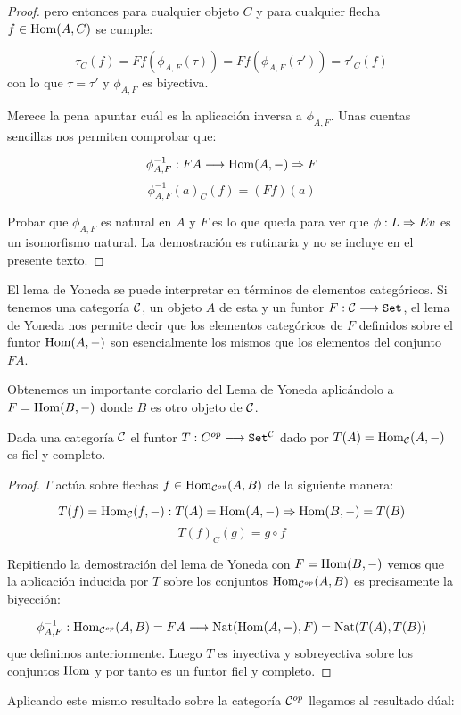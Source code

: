 \begin{proof}
  pero entonces para cualquier objeto $C$ y para cualquier flecha $f \in \operatorname{Hom}(A, C)$
  se cumple:

  $$\tau_C(f) = Ff (\phi_{A,F}(\tau)) = Ff(\phi_{A, F}(\tau')) = \tau'_C(f)$$
  con lo que $\tau = \tau'$ y $\phi_{A, F}$ es biyectiva.

  Merece la pena apuntar cuál es la aplicación inversa a $\phi_{A, F}$.
  Unas cuentas sencillas nos permiten comprobar que:

  $$\phi_{A,F}^{-1} : FA\longrightarrow \operatorname{Hom}(A, -)\Rightarrow F$$
  $$\phi_{A,F}^{-1}(a)_C(f) = (Ff)(a)$$


  Probar que $\phi_{A, F}$ es natural en $A$ y $F$ es lo que queda para ver
  que $\phi : L\Rightarrow Ev$ es un isomorfismo natural. La demostración es
  rutinaria y no se incluye en el presente texto.
\end{proof}

El lema de Yoneda se puede interpretar en términos de elementos
categóricos. Si tenemos una categoría $\mathcal{C}$, un objeto $A$ de esta
y un funtor $F : \mathcal{C}\longrightarrow \texttt{Set}$, el lema de Yoneda nos permite
decir que los elementos categóricos de $F$ definidos sobre
el funtor $\operatorname{Hom}(A, -)$ son esencialmente los mismos que los
elementos del conjunto $F A$.

Obtenemos un importante corolario del Lema de Yoneda aplicándolo a
$F = \operatorname{Hom}(B, -)$ donde $B$ es otro objeto de $\mathcal{C}$.

\begin{theorem}
  Dada una categoría $\mathcal{C}$
  el funtor $T : C^{op}\longrightarrow \texttt{Set}^{\mathcal{C}}$ dado por
  $T(A) = \operatorname{Hom}_{\mathcal{C}}(A, -)$ es fiel y completo.
\end{theorem}
\begin{proof}
  $T$ actúa sobre flechas
  $f \in \operatorname{Hom}_{\mathcal{C}^{op}}(A, B)$ de la siguiente manera:

  $$T(f) = \operatorname{Hom}_{\mathcal{C}}(f, -) : T(A) = \operatorname{Hom}(A, -)\Rightarrow \operatorname{Hom}(B, -) = T(B)$$
  $$T(f)_C(g) = g \circ f$$

  Repitiendo la demostración del lema de Yoneda con
  $F = \operatorname{Hom}(B, -)$ vemos que la aplicación inducida por
  $T$ sobre los conjuntos $\operatorname{Hom}_{\mathcal{C}^{op}}(A, B)$ es precisamente la
  biyección:

  $$\phi_{A, F}^{-1} : 
    \operatorname{Hom}_{\mathcal{C}^{op}}(A, B) = FA
  \longrightarrow 
    \operatorname{Nat}(\operatorname{Hom}(A, -), F) = \operatorname{Nat}(T(A), T(B))
 $$
  que definimos anteriormente.
  Luego $T$ es inyectiva y sobreyectiva sobre los conjuntos
  $\operatorname{Hom}$ y
  por tanto es un funtor fiel y completo.
\end{proof}

Aplicando este mismo resultado sobre la categoría $\mathcal{C}^{op}$ llegamos
al resultado dúal:

